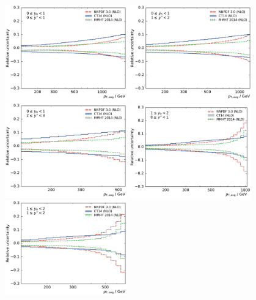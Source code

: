 \begin{figure}[htp]
    \centering
    \includegraphics[width=0.47\textwidth]{figures/theory/pdf_uncert_comp_yb0ys0.pdf}\hfill
    \includegraphics[width=0.47\textwidth]{figures/theory/pdf_uncert_comp_yb0ys1.pdf}
    \includegraphics[width=0.47\textwidth]{figures/theory/pdf_uncert_comp_yb0ys2.pdf}\hfill
    \includegraphics[width=0.47\textwidth]{figures/theory/pdf_uncert_comp_yb1ys0.pdf}
    \includegraphics[width=0.47\textwidth]{figures/theory/pdf_uncert_comp_yb1ys1.pdf}\hfill

\end{figure}
